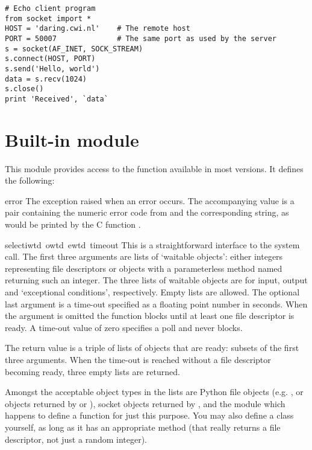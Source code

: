 \bcode\begin{verbatim}
# Echo client program
from socket import *
HOST = 'daring.cwi.nl'    # The remote host
PORT = 50007              # The same port as used by the server
s = socket(AF_INET, SOCK_STREAM)
s.connect(HOST, PORT)
s.send('Hello, world')
data = s.recv(1024)
s.close()
print 'Received', `data`
\end{verbatim}\ecode

\section{Built-in module }

This module provides access to the function  available in
most \UNIX{} versions.  It defines the following:

\renewcommand{\indexsubitem}{(in module select)}
\begin{excdesc}{error}
The exception raised when an error occurs.  The accompanying value is
a pair containing the numeric error code from  and the
corresponding string, as would be printed by the C function
.
\end{excdesc}

\begin{funcdesc}{select}{iwtd\, owtd\, ewtd\, timeout}
This is a straightforward interface to the \UNIX{} 
system call.  The first three arguments are lists of `waitable
objects': either integers representing \UNIX{} file descriptors or
objects with a parameterless method named  returning
such an integer.  The three lists of waitable objects are for input,
output and `exceptional conditions', respectively.  Empty lists are
allowed.  The optional last argument is a time-out specified as a
floating point number in seconds.  When the  argument
is omitted the function blocks until at least one file descriptor is
ready.  A time-out value of zero specifies a poll and never blocks.

The return value is a triple of lists of objects that are ready:
subsets of the first three arguments.  When the time-out is reached
without a file descriptor becoming ready, three empty lists are
returned.

Amongst the acceptable object types in the lists are Python file
objects (e.g. , or objects returned by 
or ), socket objects returned by
, and the module  which happens to
define a function  for just this purpose.  You may
also define a  class yourself, as long as it has an
appropriate  method (that really returns a \UNIX{} file
descriptor, not just a random integer).
\end{funcdesc}


